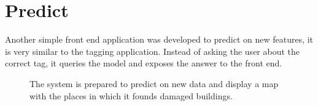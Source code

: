 \begin{figure}[h]
  \begin{center}
  \end{center}
\end{figure}

\section{Predict}

Another simple front end application was developed to predict on new features, it is very similar to the tagging application. Instead of asking the user about the correct tag, it queries the model and exposes the answer to the front end.\\


\begin{figure}[h]
  \begin{center}
  \end{center}
  \label{fig:predict}
  \caption{The system is prepared to predict on new data and display a map with the places in which it founds damaged buildings.}
\end{figure}


